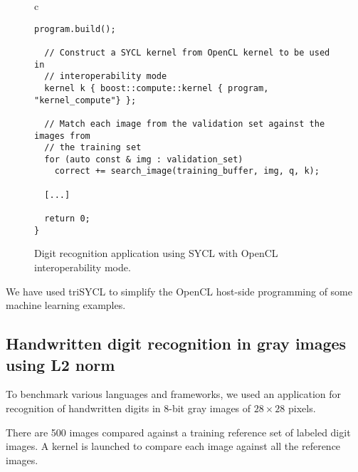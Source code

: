 \documentclass[sigplan, review, authordraft]{acmart}
\begin{document}
\begin{figure*}
\begin{tabular}{c}
\begin{lstlisting}[basicstyle=\scriptsize]
  program.build();

  // Construct a SYCL kernel from OpenCL kernel to be used in
  // interoperability mode
  kernel k { boost::compute::kernel { program, "kernel_compute"} };

  // Match each image from the validation set against the images from
  // the training set
  for (auto const & img : validation_set)
    correct += search_image(training_buffer, img, q, k);

  [...]

  return 0;
}
    \end{lstlisting}
  \end{tabular}
  \caption{Digit recognition application using SYCL with OpenCL
    interoperability mode.\label{fig:digit-SYCL-OpenCL-code}}
\end{figure*}

We have used triSYCL to simplify the OpenCL host-side programming of
some machine learning examples.


\subsection{Handwritten digit recognition in gray images using L2
  norm}
\label{sec:example-from-anast}

To benchmark various languages and frameworks, we used an application
for recognition of handwritten digits in 8-bit gray images of
$28 \times 28$ pixels.

There are 500 images compared against a training reference
set of labeled digit images. A kernel is launched to compare each
image against all the reference images.
\end{document}
